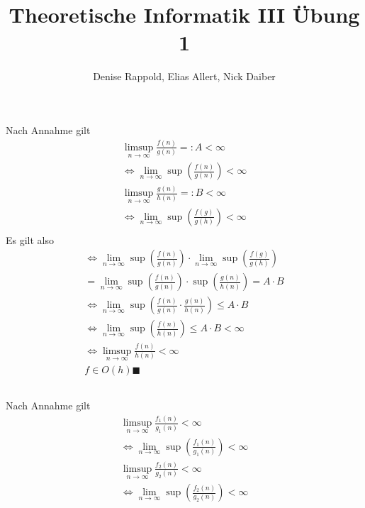 \documentclass{article}
\title{Theoretische Informatik III Übung 1}
\author{Denise Rappold, Elias Allert, Nick Daiber}
\begin{document}
    \maketitle
    \section{}
    \subsection{}
    Nach Annahme gilt
    \begin{align*}
        \limsup\limits_{n\rightarrow\infty}\frac{f(n)}{g(n)} =: A< \infty\\
        \Leftrightarrow\lim\limits_{n\rightarrow\infty}\sup(\frac{f(n)}{g(n)}) < \infty\\
        \limsup\limits_{n\rightarrow\infty}\frac{g(n)}{h(n)} =: B< \infty\\
        \Leftrightarrow\lim\limits_{n\rightarrow\infty}\sup(\frac{f(g)}{g(h)}) < \infty\\
    \end{align*}
    Es gilt also
    \begin{align*}
        \Leftrightarrow\lim\limits_{n\rightarrow\infty}\sup(\frac{f(n)}{g(n)}) \cdot
        \lim\limits_{n\rightarrow\infty}\sup(\frac{f(g)}{g(h)})\\
        = \lim\limits_{n\rightarrow\infty}\sup(\frac{f(n)}{g(n)})\cdot\sup(\frac{g(n)}{h(n)}) = A \cdot B\\
        \Leftrightarrow \lim\limits_{n\rightarrow\infty}\sup(\frac{f(n)}{g(n)}\cdot\frac{g(n)}{h(n)}) \leq A \cdot B\\
        \Leftrightarrow \lim\limits_{n\rightarrow\infty}\sup(\frac{f(n)}{h(n)}) \leq A \cdot B < \infty\\
        \Leftrightarrow \limsup\limits_{n\rightarrow\infty}\frac{f(n)}{h(n)} < \infty\\
        f\in O(h) \blacksquare
    \end{align*}
    \subsection{}
    Nach Annahme gilt
    \begin{align*}
        \limsup\limits_{n\rightarrow\infty}\frac{f_1(n)}{g_1(n)} < \infty\\
        \Leftrightarrow\lim\limits_{n\rightarrow\infty}\sup(\frac{f_1(n)}{g_1(n)}) < \infty\\
        \limsup\limits_{n\rightarrow\infty}\frac{f_2(n)}{g_2(n)} < \infty\\
        \Leftrightarrow\lim\limits_{n\rightarrow\infty}\sup(\frac{f_2(n)}{g_2(n)}) < \infty\\
    \end{align*}
\end{document}
